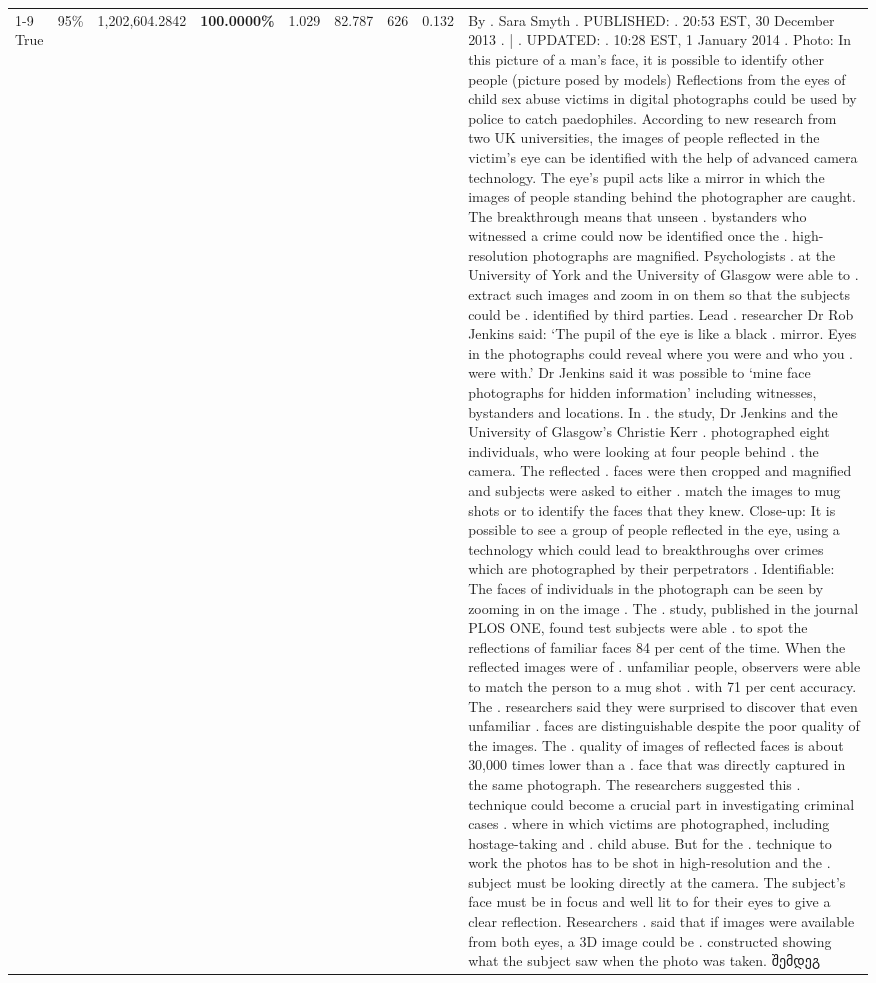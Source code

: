 \begin{table}[H]
\begin{tabular}{lllrlllll}
\cline{1-9} \cline{2-9}
True & 95\% & 1,202,604.2842 & \bfseries \color{red} 100.0000\% & 1.029 & 82.787 & 626 & 0.132 & By . Sara Smyth . PUBLISHED: . 20:53 EST, 30 December 2013 . | . UPDATED: . 10:28 EST, 1 January 2014 . Photo: In this picture of a man's face, it is possible to identify other people (picture posed by models) Reflections from the eyes of child sex abuse victims in digital photographs could be used by police to catch paedophiles. According to new research from two UK universities, the images of people reflected in the victim's eye can be identified with the help of advanced camera technology. The eye's pupil acts like a mirror in which the images of people standing behind the photographer are caught. The breakthrough means that unseen . bystanders who witnessed a crime could now be identified once the . high-resolution photographs are magnified. Psychologists . at the University of York and the University of Glasgow were able to . extract such images and zoom in on them so that the subjects could be . identified by third parties. Lead . researcher Dr Rob Jenkins said: ‘The pupil of the eye is like a black . mirror. Eyes in the photographs could reveal where you were and who you . were with.' Dr Jenkins said it was possible to ‘mine face photographs for hidden information' including witnesses, bystanders and locations. In . the study, Dr Jenkins and the University of Glasgow's Christie Kerr . photographed eight individuals, who were looking at four people behind . the camera. The reflected . faces were then cropped and magnified and subjects were asked to either . match the images to mug shots or to identify the faces that they knew. Close-up: It is possible to see a group of people reflected in the eye, using a technology which could lead to breakthroughs over crimes which are photographed by their perpetrators . Identifiable: The faces of individuals in the photograph can be seen by zooming in on the image . The . study, published in the journal PLOS ONE, found test subjects were able . to spot the reflections of familiar faces 84 per cent of the time. When the reflected images were of . unfamiliar people, observers were able to match the person to a mug shot . with 71 per cent accuracy. The . researchers said they were surprised to discover that even unfamiliar . faces are distinguishable despite the poor quality of the images. The . quality of images of reflected faces is about 30,000 times lower than a . face that was directly captured in the same photograph. The researchers suggested this . technique could become a crucial part in investigating criminal cases . where in which victims are photographed, including hostage-taking and . child abuse. But for the . technique to work the photos has to be shot in high-resolution and the . subject must be looking directly at the camera. The subject's face must be in focus and well lit to for their eyes to give a clear reflection. Researchers . said that if images were available from both eyes, a 3D image could be . constructed showing what the subject saw when the photo was taken. შემდეგ \\

\end{tabular}
\end{table}
